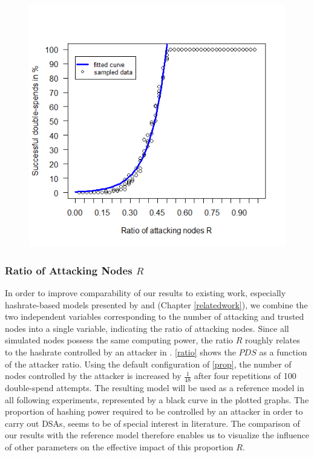 \documentclass[a4paper,12pt,twoside]{report}
\begin{document}
\begin{figure}
\begin{minipage}{.5\textwidth}
  \includegraphics[width=\linewidth]{Experiments/Ratio/ratio_f.png}
  \label{ratio}
\end{minipage}
\end{figure}

\subsubsection{Ratio of Attacking Nodes $R$}
In order to improve comparability of our results to existing work, especially hashrate-based models presented by \cite{HBDSA} and \cite{DSAwithTime} (Chapter \ref{relatedwork}), we combine the two independent variables corresponding to the number of attacking and trusted nodes into a single variable, indicating the ratio of attacking nodes. Since all simulated nodes possess the same computing power, the ratio $R$ roughly relates to the hashrate controlled by an attacker in \cite{nakamoto2008bitcoin,HBDSA,DSAwithTime}. \autoref{ratio} shows the $PDS$ as a function of the attacker ratio. Using the default configuration of \autoref{prop}, the number of nodes controlled by the attacker is increased by $\frac{1}{48}$ after four repetitions of 100 double-spend attempts. The resulting model will be used as a reference model in all following experiments, represented by a black curve in the plotted graphs. The proportion of hashing power required to be controlled by an attacker in order to carry out DSAs, seems to be of special interest in literature. The comparison of our results with the reference model therefore enables us to visualize the influence of other parameters on the effective impact of this proportion $R$.
\end{document}
